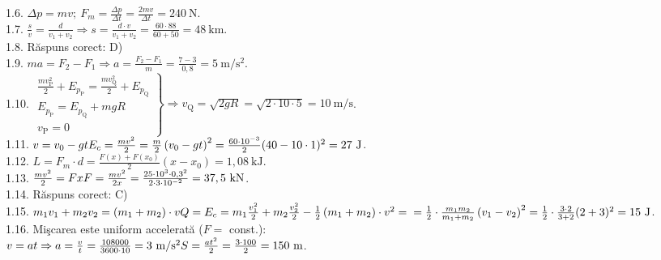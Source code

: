 1.6. $\Delta p =m v;\ F_{m} =\frac{\Delta p}{\Delta t}=\frac{2 m v}{\Delta t}=240 \mathrm{~N}$.\\

1.7. $\frac{s}{v}=\frac{d}{v_{1}+v_{2}} \Rightarrow s=\frac{d \cdot v}{v_{1}+v_{2}}=\frac{60 \cdot 88}{60+50}=48 \mathrm{~km}$.\\

1.8. Răspuns corect: D)\\

1.9. $m a=F_{2}-F_{1} \Rightarrow a=\frac{F_{2}-F_{1}}{m}=\frac{7-3}{0,8}=5 \mathrm{~m} / \mathrm{s}^{2}$.\\

1.10. $\left.\begin{array}{l} \frac{m v_{\mathrm{P}}^{2}}{2}+E_{p_{\mathrm{P}}}=\frac{m v_{\mathrm{Q}}^{2}}{2}+E_{p_{\mathrm{Q}}} \\ E_{p_{\mathrm{P}}}=E_{p_{\mathrm{Q}}}+m g R \\ v_{\mathrm{P}}=0 \end{array}\right\} \Rightarrow v_{\mathrm{Q}}=\sqrt{2 g R}=\sqrt{2 \cdot 10 \cdot 5}=10 \mathrm{~m} / \mathrm{s}$.\\

1.11. $v=v_{0}-g t\\ E_{c}=\frac{m v^{2}}{2}=\frac{m}{2}\left(v_{0}-g t\right)^{2}=\frac{60 \cdot 10^{-3}}{2}(40-10 \cdot 1)^{2}=27 \mathrm{~J}$.\\

1.12. $L=F_{m} \cdot d=\frac{F(x)+F\left(x_{0}\right)}{2}\left(x-x_{0}\right)=1,08 \mathrm{~kJ}$.\\

1.13. $\frac{m v^{2}}{2}=F x\\ F=\frac{m v^{2}}{2 x}=\frac{25 \cdot 10^{3} \cdot 0,3^{2}}{2 \cdot 3 \cdot 10^{-2}}=37,5 \mathrm{~kN}$.\\

1.14. Răspuns corect: C)\\

1.15. $m_{1} v_{1}+m_{2} v_{2}=\left(m_{1}+m_{2}\right) \cdot v\\ Q =E_{c}=m_{1} \frac{v_{1}^{2}}{2}+m_{2} \frac{v_{2}^{2}}{2}-\frac{1}{2}\left(m_{1}+m_{2}\right) \cdot v^{2}= \\ =\frac{1}{2} \cdot \frac{m_{1} m_{2}}{m_{1}+m_{2}}\left(v_{1}-v_{2}\right)^{2}=\frac{1}{2} \cdot \frac{3 \cdot 2}{3+2}(2+3)^{2}=15 \mathrm{~J}$.\\

1.16. Mişcarea este uniform accelerată ($F=$ const.):\\ $v=a t \Rightarrow a=\frac{v}{t}=\frac{108000}{3600 \cdot 10}=3 \mathrm{~m} / \mathrm{s}^{2}\\ S=\frac{a t^{2}}{2}=\frac{3 \cdot 100}{2}=150 \mathrm{~m}$.\\

